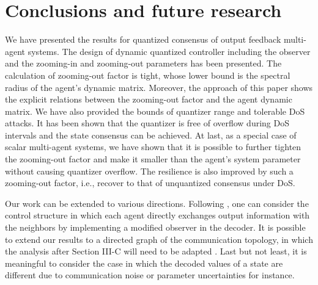 \documentclass[letterpaper,journal,final,twocolumn]{IEEEtran}
\begin{document}
\section{Conclusions and future research}

We have presented the results for quantized consensus of output feedback multi-agent systems. The design of dynamic quantized controller including the observer and the zooming-in and zooming-out parameters has been presented. The calculation of zooming-out factor is tight, whose lower bound is the spectral radius of the agent's dynamic matrix. Moreover, the approach of this paper shows the explicit relations between the zooming-out factor and the agent dynamic matrix.
We have also provided the bounds of quantizer range and tolerable DoS attacks. 
It has been shown that the quantizer is free of overflow during DoS intervals and the state consensus can be achieved. At last, as a special case of scalar multi-agent systems, we have shown 
that it is possible to further tighten the zooming-out factor and make it smaller than the agent's system parameter without causing quantizer overflow. The resilience is also improved by such a zooming-out factor, i.e., recover to that of unquantized consensus under DoS.  



Our work can be extended to various directions. Following \cite{meng2016coordination}, one can consider the control structure in which each agent directly exchanges output information with the neighbors by implementing a modified observer in the decoder. 
It is possible to extend our results to a directed graph of the communication topology, in which the analysis after Section III-C will need to be adapted \cite{8757723}. Last but not least, it is meaningful to consider the case in which the decoded values of a state are different due to communication noise or parameter uncertainties for instance. 




\appendix
\end{document}
